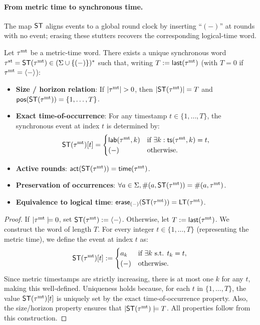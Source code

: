 \paragraph{From metric time to synchronous time.}
The map \(\mathsf{ST}\) aligns events to a global round clock by inserting ``\((-)\)'' at rounds with no event; erasing these stutters recovers the corresponding logical-time word.

\begin{lemma}
Let \(\tau^{\mathrm{mt}}\) be a metric-time word. There exists a unique synchronous word \(\tau^{\mathrm{st}}=\mathsf{ST}(\tau^{\mathrm{mt}})\in(\Sigma\cup\{(-)\})^{*}\) such that, writing \(T:=\mathsf{last}(\tau^{\mathrm{mt}})\) (with \(T=0\) if \(\tau^{\mathrm{mt}}=\langle - \rangle \)):
\begin{itemize}
  \item \textbf{Size / horizon relation}: If \(|\taumt|>0\), then \(|\ST(\taumt)| = T\) and \(\mathsf{pos}(\mathsf{ST}(\tau^{\mathrm{mt}}))=\{1,\dots,T\}\).
  \item \textbf{Exact time-of-occurrence}: For any timestamp \(t \in \{1, \dots, T\}\), the synchronous event at index \(t\) is determined by:
  \[
  \mathsf{ST}(\tau^{\mathrm{mt}})[t] = 
  \begin{cases}
    \mathsf{lab}(\tau^{\mathrm{mt}},k) & \text{if } \exists k: \mathsf{ts}(\tau^{\mathrm{mt}},k) = t, \\
    (-) & \text{otherwise.}
  \end{cases}
  \]
  \item \textbf{Active rounds}: \(\mathsf{act}(\mathsf{ST}(\tau^{\mathrm{mt}})) = \mathsf{time}(\tau^{\mathrm{mt}})\).
 \item \textbf{Preservation of occurrences}: \(\forall a\in\Sigma, \#(a,\mathsf{ST}(\tau^{\mathrm{mt}})) = \#(a,\tau^{\mathrm{mt}})\).
  \item \textbf{Equivalence to logical time}: \(\mathsf{erase}_{(-)}(\mathsf{ST}(\tau^{\mathrm{mt}})) = \mathsf{LT}(\tau^{\mathrm{mt}})\).
\end{itemize}
\end{lemma}

\begin{proof}
\;
If \(|\tau^{\mathrm{mt}}|=0\), set \(\mathsf{ST}(\tau^{\mathrm{mt}}):=\langle - \rangle \). Otherwise, let \(T:=\mathsf{last}(\tau^{\mathrm{mt}})\). 
We construct the word of length \(T\).
For every integer \(t \in \{1, \dots, T\}\) (representing the metric time), we define the event at index \(t\) as:
\[
\mathsf{ST}(\tau^{\mathrm{mt}})[t] :=
\begin{cases}
    a_k & \text{if } \exists k \text{ s.t. } t_k = t, \\
    (-) & \text{otherwise.}
\end{cases}
\]
Since metric timestamps are strictly increasing, there is at most one \(k\) for any \(t\), making this well-defined.
Uniqueness holds because, for each \(t\) in \(\{1,\dots,T\}\), the value \(\mathsf{ST}(\tau^{\mathrm{mt}})[t]\) is uniquely set by the exact time-of-occurrence property. Also, the size/horizon property ensures that \(|\ST(\taumt)|=T\).
All properties follow from this construction.
\end{proof}

